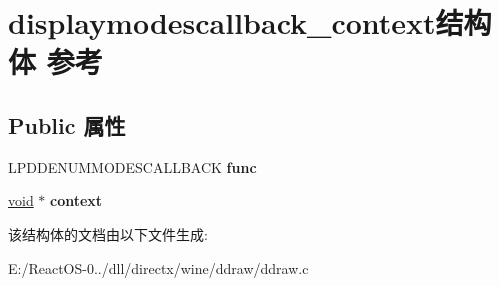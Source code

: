 \hypertarget{structdisplaymodescallback__context}{}\section{displaymodescallback\+\_\+context结构体 参考}
\label{structdisplaymodescallback__context}
\subsection*{Public 属性}
\begin{DoxyCompactItemize}
\item 
\mbox{\label{structdisplaymodescallback__context_a3b618687c264ec46c0947733bff5c02f}} 
L\+P\+D\+D\+E\+N\+U\+M\+M\+O\+D\+E\+S\+C\+A\+L\+L\+B\+A\+CK {\bfseries func}
\item 
\mbox{\label{structdisplaymodescallback__context_a61d52f73260baa99139fe2e9cd698bc0}} 
\hyperlink{interfacevoid}{void} $\ast$ {\bfseries context}
\end{DoxyCompactItemize}


该结构体的文档由以下文件生成\+:\begin{DoxyCompactItemize}
\item 
E\+:/\+React\+O\+S-\/0../dll/directx/wine/ddraw/ddraw.\+c\end{DoxyCompactItemize}
